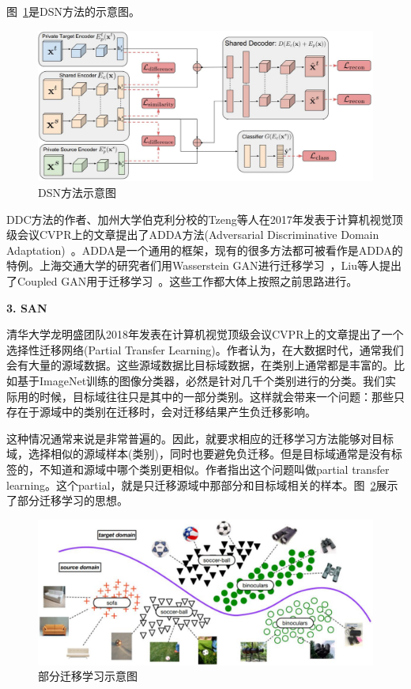 图~\ref{fig-deep-dsn}是DSN方法的示意图。

\begin{figure}[htbp]
	\centering
	\includegraphics[scale=0.32]{./figures/fig-deep-dsn.pdf}
	\caption{DSN方法示意图}
	\label{fig-deep-dsn}
\end{figure}

DDC方法的作者、加州大学伯克利分校的Tzeng等人在2017年发表于计算机视觉顶级会议CVPR上的文章提出了ADDA方法(Adversarial Discriminative Domain Adaptation)~\cite{tzeng2017adversarial}。ADDA是一个通用的框架，现有的很多方法都可被看作是ADDA的特例。上海交通大学的研究者们用Wasserstein GAN进行迁移学习~\cite{shen2018w}，Liu等人提出了Coupled GAN用于迁移学习~\cite{liu2016coupled}。这些工作都大体上按照之前思路进行。

\textbf{3. SAN}

清华大学龙明盛团队2018年发表在计算机视觉顶级会议CVPR上的文章提出了一个选择性迁移网络(Partial Transfer Learning)。作者认为，在大数据时代，通常我们会有大量的源域数据。这些源域数据比目标域数据，在类别上通常都是丰富的。比如基于ImageNet训练的图像分类器，必然是针对几千个类别进行的分类。我们实际用的时候，目标域往往只是其中的一部分类别。这样就会带来一个问题：那些只存在于源域中的类别在迁移时，会对迁移结果产生负迁移影响。

这种情况通常来说是非常普遍的。因此，就要求相应的迁移学习方法能够对目标域，选择相似的源域样本(类别)，同时也要避免负迁移。但是目标域通常是没有标签的，不知道和源域中哪个类别更相似。作者指出这个问题叫做partial transfer learning。这个partial，就是只迁移源域中那部分和目标域相关的样本。图~\ref{fig-deep-partial}展示了部分迁移学习的思想。

\begin{figure}[htbp]
	\centering
	\includegraphics[scale=0.32]{./figures/fig-deep-partial.pdf}
	\caption{部分迁移学习示意图}
	\label{fig-deep-partial}
\end{figure}

